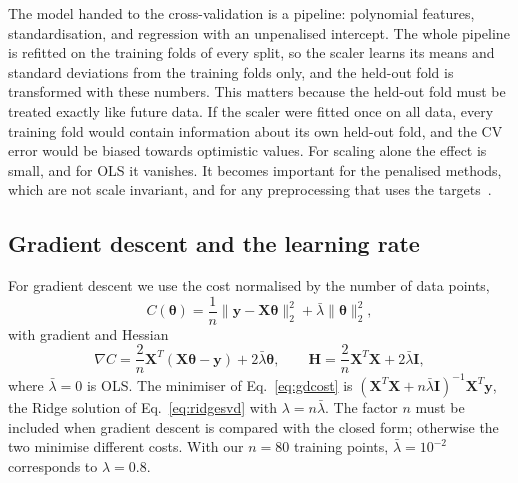 \documentclass[aps,reprint,amsmath,amssymb,nofootinbib,floatfix]{revtex4-2}
\newcommand{\lb}{\bar\lambda}
\newcommand{\norm}[1]{\lVert #1\rVert}
\begin{document}
The model handed to the cross-validation is a pipeline: polynomial features, standardisation, and
regression with an unpenalised intercept. The whole pipeline is refitted on the training folds of
every split, so the scaler learns its means and standard deviations from the training folds only,
and the held-out fold is transformed with these numbers. This matters because the held-out fold
must be treated exactly like future data. If the scaler were fitted once on all data, every
training fold would contain information about its own held-out fold, and the CV error would be
biased towards optimistic values. For scaling alone the effect is small, and for OLS it vanishes.
It becomes important for the penalised methods, which are not scale invariant, and for any
preprocessing that uses the targets~\cite{hjorthjensen2026}.

\subsection{Gradient descent and the learning rate}\label{sec:gd}

For gradient descent we use the cost normalised by the number of data points,
\begin{equation}
  C(\bm\theta)=\frac1n\norm{\bm y-\bm X\bm\theta}_2^2+\lb\norm{\bm\theta}_2^2,
  \label{eq:gdcost}
\end{equation}
with gradient and Hessian
\begin{equation}
  \nabla C=\frac2n\bm X^T(\bm X\bm\theta-\bm y)+2\lb\bm\theta,\qquad
  \bm H=\frac2n\bm X^T\bm X+2\lb\bm I,
  \label{eq:grad}
\end{equation}
where $\lb=0$ is OLS. The minimiser of Eq.~\eqref{eq:gdcost} is
$(\bm X^T\bm X+n\lb\bm I)^{-1}\bm X^T\bm y$, the Ridge solution of Eq.~\eqref{eq:ridgesvd} with
$\lambda=n\lb$. The factor $n$ must be included when gradient descent is compared with the closed
form; otherwise the two minimise different costs. With our $n=80$ training points, $\lb=10^{-2}$
corresponds to $\lambda=0.8$.
\end{document}
